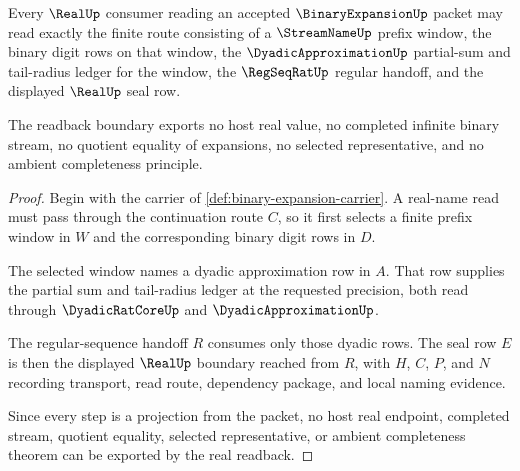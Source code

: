 \begin{theorem}
\label{thm:binary-expansion-real-readback-boundary}
Every $\RealUp$ consumer reading an accepted $\BinaryExpansionUp$ packet may read exactly the finite route consisting of a $\StreamNameUp$ prefix window, the binary digit rows on that window, the $\DyadicApproximationUp$ partial-sum and tail-radius ledger for the window, the $\RegSeqRatUp$ regular handoff, and the displayed $\RealUp$ seal row.

The readback boundary exports no host real value, no completed infinite binary stream, no quotient equality of expansions, no selected representative, and no ambient completeness principle.
\end{theorem}
\begin{proof}
Begin with the carrier of \autoref{def:binary-expansion-carrier}. A real-name read must pass through the continuation route $C$, so it first selects a finite prefix window in $W$ and the corresponding binary digit rows in $D$.

The selected window names a dyadic approximation row in $A$. That row supplies the partial sum and tail-radius ledger at the requested precision, both read through $\DyadicRatCoreUp$ and $\DyadicApproximationUp$.

The regular-sequence handoff $R$ consumes only those dyadic rows. The seal row $E$ is then the displayed $\RealUp$ boundary reached from $R$, with $H$, $C$, $P$, and $N$ recording transport, read route, dependency package, and local naming evidence.

Since every step is a projection from the packet, no host real endpoint, completed stream, quotient equality, selected representative, or ambient completeness theorem can be exported by the real readback.
\end{proof}

